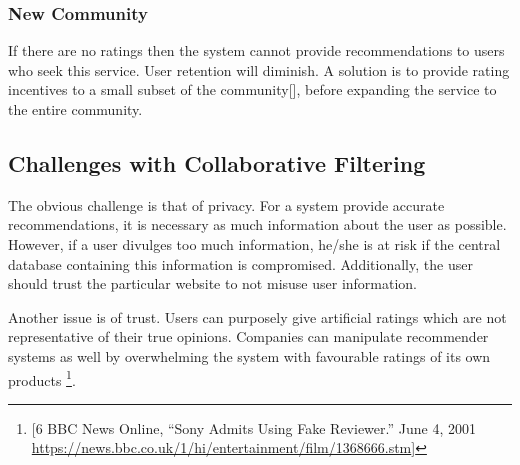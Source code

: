 \subsubsection{New Community}
If there are no ratings then the system cannot provide recommendations to users who seek this service. User retention will diminish. A solution is to provide rating incentives to a small subset of the community[], before expanding the service to the entire community. 

\subsection{Challenges with Collaborative Filtering}

The obvious challenge is that of privacy. For a system provide accurate recommendations, it is necessary as much information about the user as possible. However, if a user divulges too much information, he/she is at risk if the central database containing this information is compromised. Additionally, the user should trust the particular website to not misuse user information.

Another issue is of trust. Users can purposely give artificial ratings which are not representative of their true opinions. Companies can manipulate recommender systems as well by overwhelming the system with favourable ratings of its own products \footnote{[6 BBC News Online, ``Sony Admits Using Fake Reviewer.'' June 4, 2001 \url{https://news.bbc.co.uk/1/hi/entertainment/film/1368666.stm}]}.
